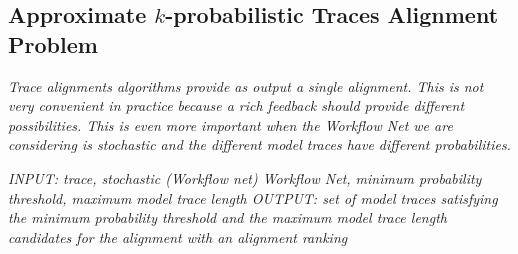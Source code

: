 \subsection{Approximate $k$-probabilistic Traces Alignment Problem}\label{subsec:akptap}



\textit{Trace alignments algorithms provide as output a single alignment. This is not very convenient in practice because a rich feedback should provide different possibilities. This is even more important when the Workflow Net we are considering is stochastic and the different model traces have different probabilities.}

\textit{INPUT: trace, stochastic (Workflow net) Workflow Net, minimum probability threshold, maximum model trace length
OUTPUT: set of model traces satisfying the minimum probability threshold and the maximum model trace length candidates for the alignment with an alignment ranking}
